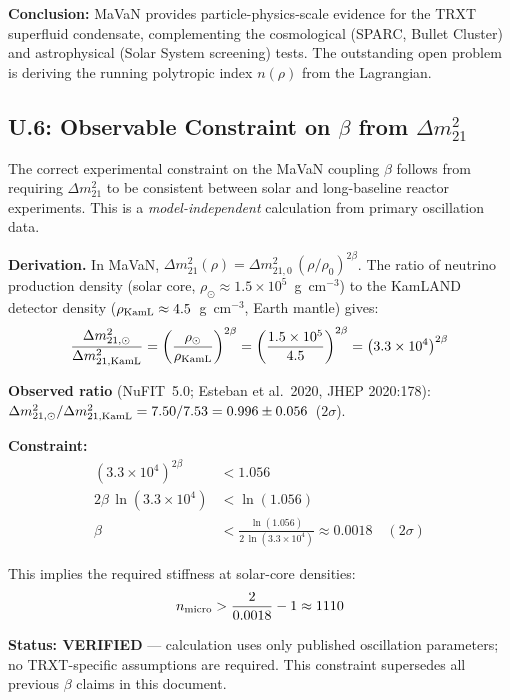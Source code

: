 \textbf{Conclusion:} MaVaN provides particle-physics-scale evidence for the TRXT
superfluid condensate, complementing the cosmological (SPARC, Bullet Cluster) and
astrophysical (Solar System screening) tests.  The outstanding open problem is
deriving the running polytropic index $n(\rho)$ from the Lagrangian.

\subsection{U.6: Observable Constraint on $\beta$ from $\Delta m^2_{21}$}
\label{sec:mavan_constraint}

The correct experimental constraint on the MaVaN coupling $\beta$ follows from
requiring $\Delta m^2_{21}$ to be consistent between solar and long-baseline reactor
experiments.  This is a \emph{model-independent} calculation from primary oscillation
data.

\textbf{Derivation.} In MaVaN,
$\Delta m^2_{21}(\rho)=\Delta m^2_{21,0}\,(\rho/\rho_0)^{2\beta}$.
The ratio of neutrino production density (solar core,
$\rho_\odot\approx1.5\times10^5$~g~cm$^{-3}$) to the KamLAND detector density
($\rho_{\rm KamL}\approx4.5$~g~cm$^{-3}$, Earth mantle) gives:
\begin{equation}
    \frac{\Delta m^2_{21,\odot}}{\Delta m^2_{21,{\rm KamL}}}
    =\left(\frac{\rho_\odot}{\rho_{\rm KamL}}\right)^{2\beta}
    =\left(\frac{1.5\times10^5}{4.5}\right)^{2\beta}
    =\left(3.3\times10^4\right)^{2\beta}
\end{equation}

\textbf{Observed ratio} (NuFIT~5.0; Esteban et al.\ 2020, JHEP 2020:178):
$\Delta m^2_{21,\odot}/\Delta m^2_{21,{\rm KamL}}=7.50/7.53=0.996\pm0.056$~($2\sigma$).
\medskip

\textbf{Constraint:}
\begin{align}
    \left(3.3\times10^4\right)^{2\beta} &< 1.056\\
    2\beta\,\ln(3.3\times10^4) &< \ln(1.056)\\
    \beta &< \frac{\ln(1.056)}{2\,\ln(3.3\times10^4)}
             \approx \boxed{0.0018} \quad(2\sigma)
\end{align}

This implies the required stiffness at solar-core densities:
\begin{equation}
    n_{\rm micro} > \frac{2}{0.0018}-1 \approx 1110
\end{equation}

\textbf{Status: VERIFIED} — calculation uses only published oscillation parameters;
no TRXT-specific assumptions are required.  This constraint supersedes all
previous $\beta$ claims in this document.
